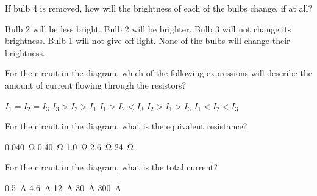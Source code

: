 \documentclass{../../oss-classkick-exam}
\begin{document}
\begin{multicols}{2}
\begin{questions}
    \question If bulb 4 is removed, how will the brightness of each of the bulbs
    change, if at all?
    \label{bulb2}
    \begin{choices}
      \choice Bulb 2 will be less bright.
      \choice Bulb 2 will be brighter.
      \choice Bulb 3 will not change its brightness.
      \choice Bulb 1 will not give off light.
      \choice None of the bulbs will change their brightness.
    \end{choices}
    \vspace{.7in}
    

    \question For the circuit in the diagram, which of the following
    expressions will describe the amount of current flowing through the
    resistors?
    \label{circ2-1}
    \begin{choices}
      \choice $I_1=I_2=I_3$
      \choice $I_3>I_2>I_1$
      \choice $I_1>I_2<I_3$
      \choice $I_2>I_1>I_3$
      \choice $I_1<I_2<I_3$
    \end{choices}
    
    \question For the circuit in the diagram, what is the equivalent resistance?
    \begin{choices}
      \choice\SI{0.040}{\ohm}
      \choice\SI{0.40}{\ohm}
      \choice\SI{1.0}{\ohm}
      \choice\SI{2.6}{\ohm}
      \choice\SI{24}{\ohm}
    \end{choices}
    
    \question For the circuit in the diagram, what is the total current?
    \begin{choices}
      \choice\SI{0.5}{\ampere}
      \choice\SI{4.6}{\ampere}
      \choice\SI{12}{\ampere}
      \choice\SI{30}{\ampere}
      \choice\SI{300}{\ampere}
    \end{choices}
    

\end{questions}
\end{multicols}
\end{document}
